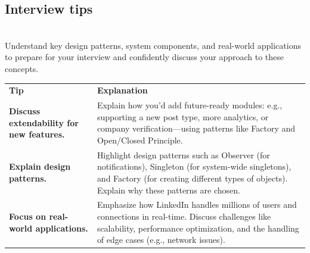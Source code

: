 \subsection{Interview tips}\label{pVn7J8itvc3msJQQaKIa2}
\\
Understand key design patterns, system components, and real-world applications to prepare for your interview and confidently discuss your approach to these concepts.

\begin{center}
{\def\LTcaptype{none} %
\begin{longtable}[]{@{}
>{\raggedright\arraybackslash} p{}
>{\raggedright\arraybackslash} p{}@{}}
\toprule\noalign{}
\endhead
\bottomrule\noalign{}
\endlastfoot
\begin{minipage}[t]{\linewidth}\raggedright
\textbf{Tip}
\end{minipage} & \begin{minipage}[t]{\linewidth}\raggedright
\textbf{Explanation}
\end{minipage} \\
\begin{minipage}[t]{\linewidth}\raggedright
\textbf{Discuss extendability for new features.}
\end{minipage} & \begin{minipage}[t]{\linewidth}\raggedright
Explain how you'd add future-ready modules: e.g., supporting a new post type, more analytics, or company verification---using patterns like Factory and Open/Closed Principle.
\end{minipage} \\
\begin{minipage}[t]{\linewidth}\raggedright
\textbf{Explain design patterns.}
\end{minipage} & \begin{minipage}[t]{\linewidth}\raggedright
Highlight design patterns such as Observer (for notifications), Singleton (for system-wide singletons), and Factory (for creating different types of objects). Explain why these patterns are chosen.
\end{minipage} \\
\begin{minipage}[t]{\linewidth}\raggedright
\textbf{Focus on real-world applications.}
\end{minipage} & \begin{minipage}[t]{\linewidth}\raggedright
Emphasize how LinkedIn handles millions of users and connections in real-time. Discuss challenges like scalability, performance optimization, and the handling of edge cases (e.g., network issues).

\end{minipage}
\end{longtable}}
\end{center}
